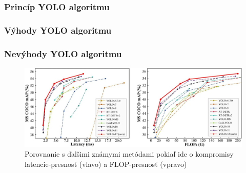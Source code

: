 \subsubsection{Princíp YOLO algoritmu}



\subsubsection{Výhody YOLO algoritmu}



\subsubsection{Nevýhody YOLO algoritmu}


\begin{figure}[H]
    \centering
    \includegraphics[width=1\linewidth]{figures/yolo.jpg}
    \caption{Porovnanie s ďalšimi známymi metódami pokiaľ ide o kompromisy latencie-presnosť (vľavo) a FLOP-presnosť (vpravo) \label{yolo}}
    \label{fig:enter-label}
\end{figure}

